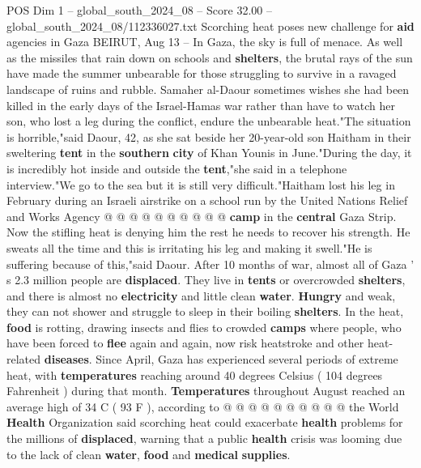 \begin{textsample}{POS Dim 1 – global\_south\_2024\_08 – Score 32.00 – global\_south\_2024\_08/112336027.txt}  \label{ex:f1_pos_322}
Scorching heat poses new challenge for \textbf{aid} agencies in Gaza BEIRUT, Aug 13 -- In Gaza, the sky is full of menace.
As well as the missiles that rain down on schools and \textbf{shelters}, the brutal rays of the sun have made the summer unbearable for those struggling to survive in a ravaged landscape of ruins and rubble.
Samaher al-Daour sometimes wishes she had been killed in the early days of the Israel-Hamas war rather than have to watch her son, who lost a leg during the conflict, endure the unbearable heat."The situation is horrible,"said Daour, 42, as she sat beside her 20-year-old son Haitham in their sweltering \textbf{tent} in the \textbf{southern} \textbf{city} of Khan Younis in June."During the day, it is incredibly hot inside and outside the \textbf{tent},"she said in a telephone interview."We go to the sea but it is still very difficult."Haitham lost his leg in February during an Israeli airstrike on a school run by the United Nations Relief and Works Agency @ @ @ @ @ @ @ @ @ @ \textbf{camp} in the \textbf{central} Gaza Strip.
Now the stifling heat is denying him the rest he needs to recover his strength.
He sweats all the time and this is irritating his leg and making it swell."He is suffering because of this,"said Daour.
After 10 months of war, almost all of Gaza ' s 2.3 million people are \textbf{displaced}.
They live in \textbf{tents} or overcrowded \textbf{shelters}, and there is almost no \textbf{electricity} and little clean \textbf{water}. \textbf{Hungry} and weak, they can not shower and struggle to sleep in their boiling \textbf{shelters}.
In the heat, \textbf{food} is rotting, drawing insects and flies to crowded \textbf{camps} where people, who have been forced to \textbf{flee} again and again, now risk heatstroke and other heat-related \textbf{diseases}.
Since April, Gaza has experienced several periods of extreme heat, with \textbf{temperatures} reaching around 40 degrees Celsius ( 104 degrees Fahrenheit ) during that month. \textbf{Temperatures} throughout August reached an average high of 34 C ( 93 F ), according to @ @ @ @ @ @ @ @ @ @ the World \textbf{Health} Organization said scorching heat could exacerbate \textbf{health} problems for the millions of \textbf{displaced}, warning that a public \textbf{health} crisis was looming due to the lack of clean \textbf{water}, \textbf{food} and \textbf{medical} \textbf{supplies}.

\end{textsample}
